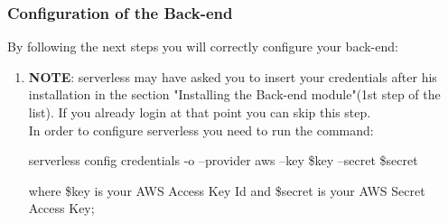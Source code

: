 \subsubsection{Configuration of the Back-end}
By following the next steps you will correctly configure your back-end:
\begin{enumerate}
\item \textbf{NOTE}: serverless may have asked you to insert your credentials after his installation in the section "Installing the Back-end module"(1st step of the list). If you already login at that point you can skip this step.\\ 
In order to configure serverless you need to run the command:
\begin{center}
serverless config credentials -o --provider aws --key \$key --secret \$secret
\end{center}
where \$key is your AWS Access Key Id and \$secret is your AWS Secret Access Key;
\end{enumerate}
